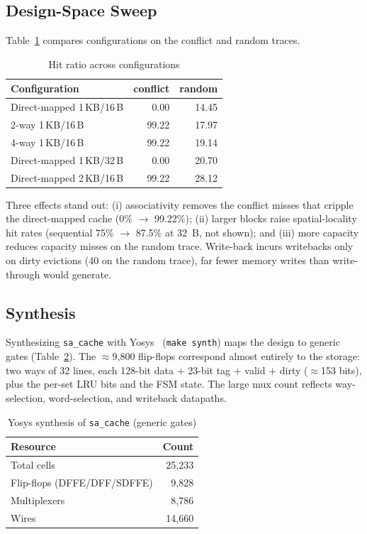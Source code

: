 \documentclass[conference]{IEEEtran}
\begin{document}
\subsection{Design-Space Sweep}
Table~\ref{tab:sweep} compares configurations on the conflict and random
traces.

\begin{table}[htbp]
\caption{Hit ratio across configurations}
\label{tab:sweep}
\centering
\begin{tabular}{@{}lrr@{}}
\toprule
\textbf{Configuration} & \textbf{conflict} & \textbf{random} \\
\midrule
Direct-mapped 1\,KB/16\,B & 0.00  & 14.45 \\
2-way 1\,KB/16\,B         & 99.22 & 17.97 \\
4-way 1\,KB/16\,B         & 99.22 & 19.14 \\
Direct-mapped 1\,KB/32\,B & 0.00  & 20.70 \\
Direct-mapped 2\,KB/16\,B & 99.22 & 28.12 \\
\bottomrule
\end{tabular}
\end{table}

Three effects stand out: (i) associativity removes the conflict misses that
cripple the direct-mapped cache (0\% $\rightarrow$ 99.22\%); (ii) larger blocks
raise spatial-locality hit rates (sequential 75\% $\rightarrow$ 87.5\% at 32~B,
not shown); and (iii) more capacity reduces capacity misses on the random
trace. Write-back incurs writebacks only on dirty evictions (40 on the random
trace), far fewer memory writes than write-through would generate.

\subsection{Synthesis}
Synthesizing \texttt{sa\_cache} with Yosys~\cite{yosys} (\texttt{make synth})
maps the design to generic gates (Table~\ref{tab:synth}). The $\approx$9{,}800
flip-flops correspond almost entirely to the storage: two ways of 32 lines,
each 128-bit data $+$ 23-bit tag $+$ valid $+$ dirty ($\approx$153 bits), plus
the per-set LRU bits and the FSM state. The large mux count reflects
way-selection, word-selection, and writeback datapaths.

\begin{table}[htbp]
\caption{Yosys synthesis of \texttt{sa\_cache} (generic gates)}
\label{tab:synth}
\centering
\begin{tabular}{@{}lr@{}}
\toprule
\textbf{Resource} & \textbf{Count} \\
\midrule
Total cells        & 25{,}233 \\
Flip-flops (DFFE/DFF/SDFFE) & 9{,}828 \\
Multiplexers       & 8{,}786 \\
Wires              & 14{,}660 \\
\bottomrule
\end{tabular}
\end{table}
\end{document}
